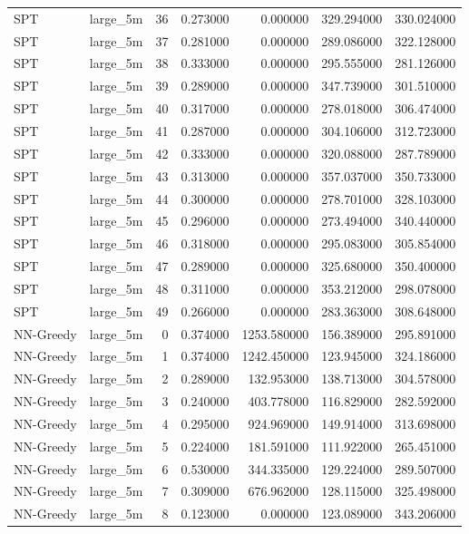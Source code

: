 \begin{tabular}{llrrrrr}
SPT & large_5m & 36 & 0.273000 & 0.000000 & 329.294000 & 330.024000 \\
SPT & large_5m & 37 & 0.281000 & 0.000000 & 289.086000 & 322.128000 \\
SPT & large_5m & 38 & 0.333000 & 0.000000 & 295.555000 & 281.126000 \\
SPT & large_5m & 39 & 0.289000 & 0.000000 & 347.739000 & 301.510000 \\
SPT & large_5m & 40 & 0.317000 & 0.000000 & 278.018000 & 306.474000 \\
SPT & large_5m & 41 & 0.287000 & 0.000000 & 304.106000 & 312.723000 \\
SPT & large_5m & 42 & 0.333000 & 0.000000 & 320.088000 & 287.789000 \\
SPT & large_5m & 43 & 0.313000 & 0.000000 & 357.037000 & 350.733000 \\
SPT & large_5m & 44 & 0.300000 & 0.000000 & 278.701000 & 328.103000 \\
SPT & large_5m & 45 & 0.296000 & 0.000000 & 273.494000 & 340.440000 \\
SPT & large_5m & 46 & 0.318000 & 0.000000 & 295.083000 & 305.854000 \\
SPT & large_5m & 47 & 0.289000 & 0.000000 & 325.680000 & 350.400000 \\
SPT & large_5m & 48 & 0.311000 & 0.000000 & 353.212000 & 298.078000 \\
SPT & large_5m & 49 & 0.266000 & 0.000000 & 283.363000 & 308.648000 \\
NN-Greedy & large_5m & 0 & 0.374000 & 1253.580000 & 156.389000 & 295.891000 \\
NN-Greedy & large_5m & 1 & 0.374000 & 1242.450000 & 123.945000 & 324.186000 \\
NN-Greedy & large_5m & 2 & 0.289000 & 132.953000 & 138.713000 & 304.578000 \\
NN-Greedy & large_5m & 3 & 0.240000 & 403.778000 & 116.829000 & 282.592000 \\
NN-Greedy & large_5m & 4 & 0.295000 & 924.969000 & 149.914000 & 313.698000 \\
NN-Greedy & large_5m & 5 & 0.224000 & 181.591000 & 111.922000 & 265.451000 \\
NN-Greedy & large_5m & 6 & 0.530000 & 344.335000 & 129.224000 & 289.507000 \\
NN-Greedy & large_5m & 7 & 0.309000 & 676.962000 & 128.115000 & 325.498000 \\
NN-Greedy & large_5m & 8 & 0.123000 & 0.000000 & 123.089000 & 343.206000 \\

\end{tabular}
